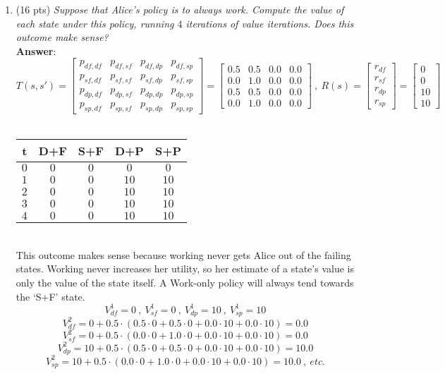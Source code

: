 \documentclass[fleqn]{hw4}
\begin{document}
\begin{enumerate}

\item(16 pts) \textit{Suppose that Alice's policy is to always work.  Compute the value
of each state under this policy, running $4$ iterations of value
iterations.  Does this outcome make sense?} \\
\textbf{Answer}: \\
$$ T(s,s') = \begin{bmatrix}
p_{df,df} & p_{df,sf} & p_{df,dp} & p_{df,sp} \\
p_{sf,df} & p_{sf,sf} & p_{sf,dp} & p_{sf,sp} \\
p_{dp,df} & p_{dp,sf} & p_{dp,dp} & p_{dp,sp} \\
p_{sp,df} & p_{sp,sf} & p_{sp,dp} & p_{sp,sp} 
\end{bmatrix} = \begin{bmatrix}
0.5 & 0.5 & 0.0 & 0.0 \\
0.0 & 1.0 & 0.0 & 0.0 \\
0.5 & 0.5 & 0.0 & 0.0 \\
0.0 & 1.0 & 0.0 & 0.0
\end{bmatrix} \ , \ R(s) = \begin{bmatrix}
r_{df} \\
r_{sf} \\
r_{dp} \\
r_{sp} 
\end{bmatrix} = \begin{bmatrix}
0 \\
0 \\
10 \\
10 
\end{bmatrix}  $$ \\
\begin{tabular}{|c||c|c|c|c|}
\hline
{\bf t} & D+F & S+F & D+P & S+P \\
\hline
$0$ & $0$ & $0$ & $0$  & $0$  \\
\hline
$1$ & $0$ & $0$ & $10$ & $10$ \\
\hline
$2$ & $0$ & $0$ & $10$ & $10$ \\
\hline
$3$ & $0$ & $0$ & $10$ & $10$ \\
\hline
$4$ & $0$ & $0$ & $10$ & $10$ \\
\hline
\end{tabular} \\
This outcome makes sense because working never gets Alice out of the failing states. Working never increases her utility, so her estimate
of a state's value is only the value of the state itself.  A Work-only policy will always tend towards the `S+F' state.\\
$$ V_{df}^{1}=0 \ , \ V_{sf}^{1}=0 \ , \ V_{dp}^{1}=10 \ , \ V_{sp}^{1}=10 $$
$$ V_{df}^{2}=0 + 0.5\cdot ( 0.5 \cdot 0+ 0.5 \cdot 0+ 0.0 \cdot 10+ 0.0 \cdot 10 )=0.0 $$
$$ V_{sf}^{2}=0 + 0.5\cdot ( 0.0 \cdot 0+ 1.0 \cdot 0+ 0.0 \cdot 10+ 0.0 \cdot 10 )=0.0 $$
$$ V_{dp}^{2}=10 + 0.5\cdot ( 0.5 \cdot 0+ 0.5 \cdot 0+ 0.0 \cdot 10+ 0.0 \cdot 10 )=10.0 $$
$$ V_{sp}^{2}=10 + 0.5\cdot ( 0.0 \cdot 0+ 1.0 \cdot 0+ 0.0 \cdot 10+ 0.0 \cdot 10 )=10.0 \ , \ etc. $$


\end{enumerate}
\end{document}
